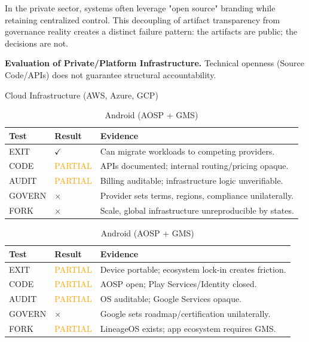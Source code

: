 \documentclass{article}
\begin{document}
In the private sector, systems often leverage "open source" branding while retaining centralized control. This decoupling of artifact transparency from governance reality creates a distinct failure pattern: the artifacts are public; the decisions are not.

\begin{table}[htbp]
    \centering
    \scriptsize
    \caption{\textbf{Evaluation of Private/Platform Infrastructure.} Technical openness (Source Code/APIs) does not guarantee structural accountability.}
    \label{tab:corp_infra}

    \begin{subtable}{1\textwidth}
        \centering
        \caption{Cloud Infrastructure (AWS, Azure, GCP)}
        \begin{tabular}{@{}llp{7cm}@{}}
            \toprule
            \textbf{Test} & \textbf{Result} & \textbf{Evidence} \\
            \midrule
            EXIT & $\checkmark$ & Can migrate workloads to competing providers. \\
            CODE & \textcolor{orange}{PARTIAL} & APIs documented; internal routing/pricing opaque. \\
            AUDIT & \textcolor{orange}{PARTIAL} & Billing auditable; infrastructure logic unverifiable. \\
            GOVERN & $\times$ & Provider sets terms, regions, compliance unilaterally. \\
            FORK & $\times$ & Scale, global infrastructure unreproducible by states. \\
            \bottomrule
        \end{tabular}
    \end{subtable}

    \begin{subtable}{1\textwidth}
        \centering
        \caption{Android (AOSP + GMS)}
        \begin{tabular}{@{}llp{7cm}@{}}
            \toprule
            \textbf{Test} & \textbf{Result} & \textbf{Evidence} \\
            \midrule
            EXIT & \textcolor{orange}{PARTIAL} & Device portable; ecosystem lock-in creates friction. \\
            CODE & \textcolor{orange}{PARTIAL} & AOSP open; Play Services/Identity closed. \\
            AUDIT & \textcolor{orange}{PARTIAL} & OS auditable; Google Services opaque. \\
            GOVERN & $\times$ & Google sets roadmap/certification unilaterally. \\
            FORK & \textcolor{orange}{PARTIAL} & LineageOS exists; app ecosystem requires GMS. \\
            \bottomrule
        \end{tabular}
    \end{subtable}


\end{table}
\end{document}
